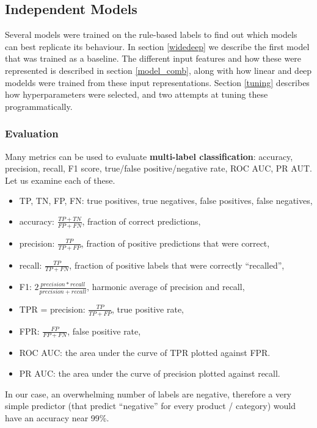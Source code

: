 \subsection{Independent Models}
\label{exp_models}

Several models were trained on the rule-based labels to find out which models can best replicate its behaviour.
In section \ref{widedeep} we describe the first model that was trained as a baseline.
The different input features and how these were represented is described in section \ref{model_comb}, along with how linear and deep modelds were trained from these input representations.
Section \ref{tuning} describes how hyperparameters were selected, and two attempts at tuning these programmatically.


\subsubsection{Evaluation}

Many metrics can be used to evaluate \textbf{multi-label classification}: accuracy, precision, recall, F1 score, true/false positive/negative rate, ROC AUC, PR AUT. Let us examine each of these.

\begin{itemize}
  \item TP, TN, FP, FN: true positives, true negatives, false positives, false negatives,
  \item accuracy: $\frac{TP + TN}{FP + FN}$, fraction of correct predictions,
  \item precision: $\frac{TP}{TP + FP}$, fraction of positive predictions that were correct,
  \item recall: $\frac{TP}{TP + FN}$, fraction of positive labels that were correctly ``recalled'',
  \item F1: $2\frac{precision * recall}{precision + recall}$, harmonic average of precision and recall,
  \item TPR = precision: $\frac{TP}{TP+FP}$, true positive rate,
  \item FPR: $\frac{FP}{FP+FN}$, false positive rate,
  \item ROC AUC: the area under the curve of TPR plotted against FPR.
  \item PR AUC: the area under the curve of precision plotted against recall.
\end{itemize}

In our case, an overwhelming number of labels are negative, therefore a very simple predictor (that predict ``negative'' for every product / category) would have an accuracy near 99\%.


